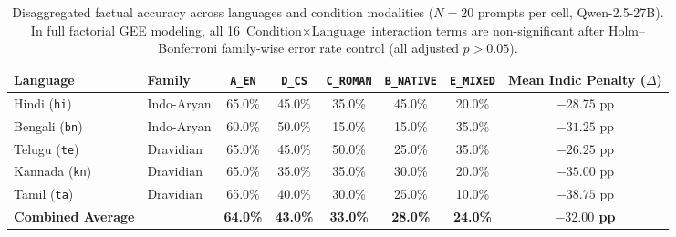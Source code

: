 \begin{table}[t]
\centering
\small
\begin{tabular}{llcccccc}
\toprule
\textbf{Language} & \textbf{Family} & \texttt{A\_EN} & \texttt{D\_CS} & \texttt{C\_ROMAN} & \texttt{B\_NATIVE} & \texttt{E\_MIXED} & \textbf{Mean Indic Penalty ($\Delta$)} \\
\midrule
Hindi (\texttt{hi}) & Indo-Aryan & 65.0\% & 45.0\% & 35.0\% & 45.0\% & 20.0\% & $-28.75$ pp \\
Bengali (\texttt{bn}) & Indo-Aryan & 60.0\% & 50.0\% & 15.0\% & 15.0\% & 35.0\% & $-31.25$ pp \\
Telugu (\texttt{te}) & Dravidian & 65.0\% & 45.0\% & 50.0\% & 25.0\% & 35.0\% & $-26.25$ pp \\
Kannada (\texttt{kn}) & Dravidian & 65.0\% & 35.0\% & 35.0\% & 30.0\% & 20.0\% & $-35.00$ pp \\
Tamil (\texttt{ta}) & Dravidian & 65.0\% & 40.0\% & 30.0\% & 25.0\% & 10.0\% & $-38.75$ pp \\
\midrule
\textbf{Combined Average} & & \textbf{64.0\%} & \textbf{43.0\%} & \textbf{33.0\%} & \textbf{28.0\%} & \textbf{24.0\%} & \textbf{$-32.00$ pp} \\
\bottomrule
\end{tabular}
\caption{Disaggregated factual accuracy across languages and condition modalities ($N=20$ prompts per cell, Qwen-2.5-27B). In full factorial GEE modeling, all 16 $\text{Condition} \times \text{Language}$ interaction terms are non-significant after Holm--Bonferroni family-wise error rate control (all adjusted $p > 0.05$).}
\label{tab:language_interactions}
\end{table}
